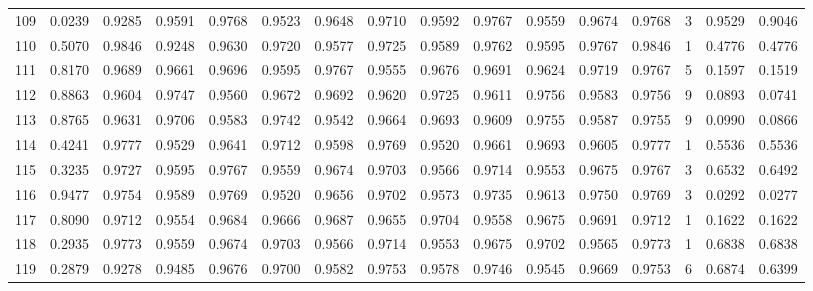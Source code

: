 \begin{tabular}{lrrrrrrrrrrrrrrr}
109 &      0.0239 &  0.9285 &  0.9591 &  0.9768 &  0.9523 &  0.9648 &  0.9710 &  0.9592 &  0.9767 &  0.9559 &   0.9674 &     0.9768 &      3 &                    0.9529 &                     0.9046 \\
110 &      0.5070 &  0.9846 &  0.9248 &  0.9630 &  0.9720 &  0.9577 &  0.9725 &  0.9589 &  0.9762 &  0.9595 &   0.9767 &     0.9846 &      1 &                    0.4776 &                     0.4776 \\
111 &      0.8170 &  0.9689 &  0.9661 &  0.9696 &  0.9595 &  0.9767 &  0.9555 &  0.9676 &  0.9691 &  0.9624 &   0.9719 &     0.9767 &      5 &                    0.1597 &                     0.1519 \\
112 &      0.8863 &  0.9604 &  0.9747 &  0.9560 &  0.9672 &  0.9692 &  0.9620 &  0.9725 &  0.9611 &  0.9756 &   0.9583 &     0.9756 &      9 &                    0.0893 &                     0.0741 \\
113 &      0.8765 &  0.9631 &  0.9706 &  0.9583 &  0.9742 &  0.9542 &  0.9664 &  0.9693 &  0.9609 &  0.9755 &   0.9587 &     0.9755 &      9 &                    0.0990 &                     0.0866 \\
114 &      0.4241 &  0.9777 &  0.9529 &  0.9641 &  0.9712 &  0.9598 &  0.9769 &  0.9520 &  0.9661 &  0.9693 &   0.9605 &     0.9777 &      1 &                    0.5536 &                     0.5536 \\
115 &      0.3235 &  0.9727 &  0.9595 &  0.9767 &  0.9559 &  0.9674 &  0.9703 &  0.9566 &  0.9714 &  0.9553 &   0.9675 &     0.9767 &      3 &                    0.6532 &                     0.6492 \\
116 &      0.9477 &  0.9754 &  0.9589 &  0.9769 &  0.9520 &  0.9656 &  0.9702 &  0.9573 &  0.9735 &  0.9613 &   0.9750 &     0.9769 &      3 &                    0.0292 &                     0.0277 \\
117 &      0.8090 &  0.9712 &  0.9554 &  0.9684 &  0.9666 &  0.9687 &  0.9655 &  0.9704 &  0.9558 &  0.9675 &   0.9691 &     0.9712 &      1 &                    0.1622 &                     0.1622 \\
118 &      0.2935 &  0.9773 &  0.9559 &  0.9674 &  0.9703 &  0.9566 &  0.9714 &  0.9553 &  0.9675 &  0.9702 &   0.9565 &     0.9773 &      1 &                    0.6838 &                     0.6838 \\
119 &      0.2879 &  0.9278 &  0.9485 &  0.9676 &  0.9700 &  0.9582 &  0.9753 &  0.9578 &  0.9746 &  0.9545 &   0.9669 &     0.9753 &      6 &                    0.6874 &                     0.6399 \\

\end{tabular}
